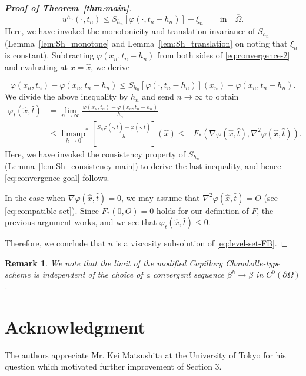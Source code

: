 \documentclass[11pt]{article}
\numberwithin{equation}{section}
\newtheorem{remark}[theorem]{Remark}
\newcommand{\pOmega}[0]{\partial\Omega}
\newcommand{\closure}[1]{\overline{#1}}
\newcommand{\fix}[1]{\textcolor{red}{#1}}
\newcommand{\relaxlimitSup}[0]{{\limsup_{h\to 0}}^*}
\def\leq{\leqslant}
\begin{document}
\begin{proof}[\textbf{Proof of Theorem~\ref{thm:main}}]
    \begin{equation}
        \label{eq:convergence-2}
        u^{h_n}(\cdot, t_n) \leq S_{h_n}\left[\varphi(\cdot, t_n - h_n)\right] + \xi_n\qquad\mbox{in}\quad \closure{\Omega}.
    \end{equation}
    Here, we have invoked the monotonicity and translation invariance of $S_{h_n}$ (Lemma~\ref{lem:Sh_monotone} and Lemma~\ref{lem:Sh_translation} on noting that $\xi_n$ is constant).
    Subtracting $\varphi(x_n,t_n-h_n)$ from both sides of \eqref{eq:convergence-2} and evaluating at $x = \hat x$,
    we derive

    \begin{equation*}
        \varphi(x_n, t_n) - \varphi(x_n, t_n-h_n) \leq S_{h_n}\left[\varphi(\cdot,t_n-h_n)\right](x_n) - \varphi(x_n,t_n-h_n).
    \end{equation*}
    We divide the above inequality by $h_n$ and send $n\to\infty$ to obtain
    \begin{align*}
    \varphi_t(\hat x,\hat t) &= \lim_{n\to\infty}\frac{\varphi(x_n,t_n) - \varphi(x_n,t_n-h_n)}{h_n}\\
    &\leq \relaxlimitSup\left[\frac{S_h\varphi(\cdot,\hat t) - \varphi(\cdot,\hat t)}{h}\right](\hat x)\leq -F_*(\nabla\varphi(\hat x,\hat t), \nabla^2\varphi(\hat x,\hat t)).
    \end{align*}
    Here, we have invoked the consistency property of $S_{h_n}$ (Lemma~\ref{lem:Sh_consistency-main}) to derive the last inequality,
    and hence \eqref{eq:convergence-goal} follows.

    In the case when $\nabla\varphi(\hat x,\hat t) = 0$, we may assume that $\nabla^2\varphi(\hat x,\hat t) = O$ (see \eqref{eq:compatible-set}).
    Since $F_*(0,O) = 0$ holds for our definition of $F$, the previous argument works, and we see that $\varphi_t(\hat x,\hat t) \leq 0$.

    Therefore, we conclude that $\overline{u}$ is a viscosity subsolution of \eqref{eq:level-set-FB}.
\end{proof}

\begin{remark}
We note that the limit of the modified Capillary Chambolle-type scheme is independent of the choice of a convergent sequence $\beta^h \to \beta$ in $C^0(\pOmega)$.
\end{remark}


\section*{Acknowledgment} The authors appreciate Mr. Kei Matsushita at the University of Tokyo for his question which motivated further improvement of Section 3.



\end{document}
